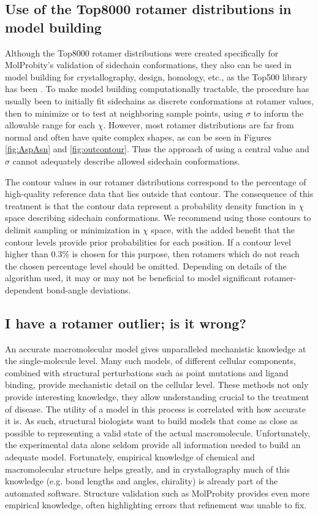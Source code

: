 \subsection{Use of the Top8000 rotamer distributions in model building}
Although the Top8000 rotamer distributions were created specifically for MolProbity's validation of sidechain conformations, they also can be used in model building for crystallography, design, homology, etc., as the Top500 library has been \cite{Arendall2005, Langer2008, Emsley:ba5144, Headd2008, Terwilliger2008, Adams:2010fk, Gainza2013,Porebski2016}. To make model building computationally tractable, \textcolor{changecolor}{the procedure has usually been to} initially fit sidechains as discrete conformations at rotamer values, then to minimize or to test at neighboring sample points, using $\sigma$ to inform the allowable range for each $\chi$. However, most rotamer distributions are far from normal and often have quite complex shapes, as can be seen in Figures \ref{fig:AspAsn} and \ref{fig:outcontour}. Thus the approach of using a central value and $\sigma$ cannot adequately describe allowed sidechain conformations. 

The contour values in our rotamer distributions correspond to the percentage of high-quality reference data that lies outside that contour. The consequence of this treatment is that the contour data represent a probability density function in $\chi$ space describing sidechain conformations. We recommend using those contours to delimit sampling or minimization in $\chi$ space, with the added benefit that the contour levels provide prior probabilities for each position. If a contour level higher than 0.3\% is chosen for this purpose, then rotamers which do not reach the chosen percentage level should be omitted. Depending on details of the algorithm used, it may or may not be beneficial to model significant rotamer-dependent bond-angle deviations.

\subsection{I have a rotamer outlier; is it wrong?}
An accurate macromolecular model gives unparalleled mechanistic knowledge at the single-molecule level. Many such models, of different cellular components, combined with structural perturbations such as point mutations and ligand binding, provide mechanistic detail on the cellular level. These methods not only provide interesting knowledge, they allow understanding crucial to the treatment of disease. The utility of a model in this process is correlated with how accurate it is. As such, structural biologists want to build models that come as close as possible to representing a valid state of the actual macromolecule. Unfortunately, the experimental data alone seldom provide all information needed to build an adequate model. Fortunately, empirical knowledge of chemical and macromolecular structure helps greatly, and in crystallography much of this knowledge (e.g. bond lengths and angles, chirality) is already part of the automated software. Structure validation such as MolProbity provides even more empirical knowledge, often highlighting errors that refinement was unable to fix.

